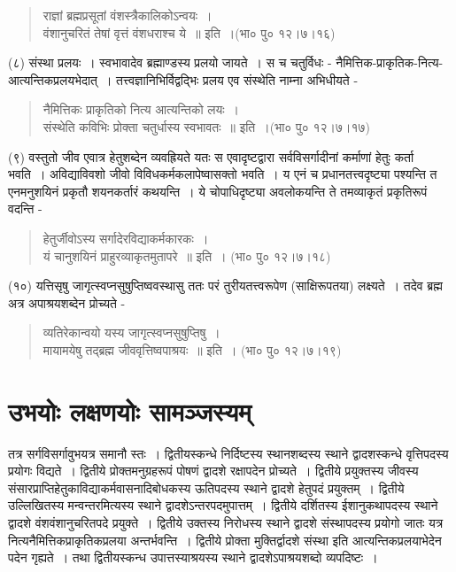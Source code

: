 \begin{verse}
राज्ञां ब्रह्मप्रसूतां वंशस्त्रैकालिकोऽन्वयः~।\\
वंशानुचरितं तेषां वृत्तं वंशधराश्च ये~॥ इति~।(भा० पु० १२।७।१६)
\end{verse}
(८) संस्था प्रलयः~। स्वभावादेव ब्रह्माण्डस्य प्रलयो जायते~। स च चतुर्विधः - नैमित्तिक-प्राकृतिक-नित्य-आत्यन्तिकप्रलयभेदात्~। तत्त्वज्ञानिभिर्विद्वद्भिः प्रलय एव संस्थेति नाम्ना अभिधीयते -
\begin{verse}
नैमित्तिकः प्राकृतिको नित्य आत्यन्तिको लयः~।\\
संस्थेति कविभिः प्रोक्ता चतुर्धास्य स्वभावतः~॥ इति~।(भा० पु० १२।७।१७)
\end{verse}
(९) वस्तुतो जीव एवात्र हेतुशब्देन व्यवह्रियते यतः स एवादृष्टद्वारा सर्वविसर्गादीनां कर्माणां हेतुः कर्ता भवति~। अविद्याविवशो जीवो विविधकर्मकलापेष्वासक्तो भवति~। य एनं च प्रधानतत्त्वदृष्ट्या पश्यन्ति त एनमनुशयिनं प्रकृतौ शयनकर्तारं कथयन्ति~। ये चोपाधिदृष्ट्या अवलोकयन्ति ते तमव्याकृतं प्रकृतिरूपं वदन्ति -
\begin{verse}
हेतुर्जीवोऽस्य सर्गादेरविद्याकर्मकारकः~।\\
यं चानुशयिनं प्राहुरव्याकृतमुतापरे~॥ इति~। (भा० पु० १२।७।१८)
\end{verse}
(१०) यत्तिसृषु जागृत्स्वप्नसुषुप्तिष्ववस्थासु ततः परं तुरीयतत्त्वरूपेण (साक्षिरूपतया) लक्ष्यते~। तदेव ब्रह्म अत्र अपाश्रयशब्देन प्रोच्यते -
\begin{verse}
व्यतिरेकान्वयो यस्य जागृत्स्वप्नसुषुप्तिषु~।\\
मायामयेषु तद्ब्रह्म जीववृत्तिष्वपाश्रयः~॥ इति~। (भा० पु० १२।७।१९)
\end{verse}

\section*{उभयोः लक्षणयोः सामञ्जस्यम्}

तत्र सर्गविसर्गावुभयत्र समानौ स्तः~। द्वितीयस्कन्धे निर्दिष्टस्य स्थानशब्दस्य स्थाने द्वादशस्कन्धे वृत्तिपदस्य प्रयोगः विद्यते~। द्वितीये प्रोक्तमनुग्रहरूपं पोषणं द्वादशे रक्षापदेन प्रोच्यते~। द्वितीये प्रयुक्तस्य जीवस्य संसारप्राप्तिहेतुकाविद्याकर्मवासनादिबोधकस्य ऊतिपदस्य स्थाने द्वादशे हेतुपदं प्रयुक्तम्~। द्वितीये उल्लिखितस्य मन्वन्तरमित्यस्य स्थाने द्वादशेऽन्तरपदमुपात्तम्~। द्वितीये दर्शितस्य ईशानुकथापदस्य स्थाने द्वादशे वंशवंशानुचरितपदे प्रयुक्ते~। द्वितीये उक्तस्य निरोधस्य स्थाने द्वादशे संस्थापदस्य प्रयोगो जातः यत्र नित्यनैमित्तिकप्राकृतिकप्रलया अन्तर्भवन्ति~। द्वितीये प्रोक्ता मुक्तिर्द्वादशे संस्था इति आत्यन्तिकप्रलयाभेदेन पदेन गृह्यते~। तथा द्वितीयस्कन्ध उपात्तस्याश्रयस्य स्थाने द्वादशेऽपाश्रयशब्दो व्यपदिष्टः~।

